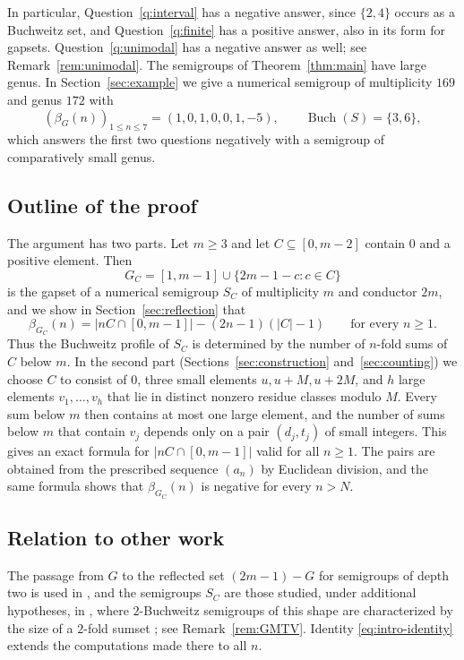 \documentclass[11pt]{amsart}
\theoremstyle{definition}
\theoremstyle{remark}
\numberwithin{equation}{section}
\newcommand{\Buch}{\operatorname{Buch}}
\begin{document}
In particular, Question~\ref{q:interval} has a negative answer, since $\{2,4\}$ occurs as a Buchweitz set, and Question~\ref{q:finite} has a positive answer, also in its form for gapsets. Question~\ref{q:unimodal} has a negative answer as well; see Remark~\ref{rem:unimodal}. The semigroups of Theorem~\ref{thm:main} have large genus. In Section~\ref{sec:example} we give a numerical semigroup of multiplicity $169$ and genus $172$ with
\[
(\beta_G(n))_{1\le n\le 7}=(1,0,1,0,0,1,-5),\qquad \Buch(S)=\{3,6\},
\]
which answers the first two questions negatively with a semigroup of comparatively small genus.

\subsection*{Outline of the proof}
The argument has two parts. Let $m\ge 3$ and let $C\subseteq[0,m-2]$ contain $0$ and a positive element. Then
\[
G_C=[1,m-1]\cup\{2m-1-c: c\in C\}
\]
is the gapset of a numerical semigroup $S_C$ of multiplicity $m$ and conductor $2m$, and we show in Section~\ref{sec:reflection} that
\begin{equation}\label{eq:intro-identity}
\beta_{G_C}(n)=|nC\cap[0,m-1]|-(2n-1)(|C|-1)\qquad\text{for every } n\ge 1.
\end{equation}
Thus the Buchweitz profile of $S_C$ is determined by the number of $n$-fold sums of $C$ below $m$. In the second part (Sections~\ref{sec:construction} and~\ref{sec:counting}) we choose $C$ to consist of $0$, three small elements $u,u+M,u+2M$, and $h$ large elements $v_1,\dots,v_h$ that lie in distinct nonzero residue classes modulo $M$. Every sum below $m$ then contains at most one large element, and the number of sums below $m$ that contain $v_j$ depends only on a pair $(d_j,t_j)$ of small integers. This gives an exact formula for $|nC\cap[0,m-1]|$ valid for all $n\ge1$. The pairs are obtained from the prescribed sequence $(a_n)$ by Euclidean division, and the same formula shows that $\beta_{G_C}(n)$ is negative for every $n>N$.

\subsection*{Relation to other work}
The passage from $G$ to the reflected set $(2m-1)-G$ for semigroups of depth two is used in \cite[Section~3]{EGMV23}, and the semigroups $S_C$ are those studied, under additional hypotheses, in \cite[Section~4]{GMTV21}, where $2$-Buchweitz semigroups of this shape are characterized by the size of a $2$-fold sumset \cite[Theorem~4.1]{GMTV21}; see Remark~\ref{rem:GMTV}. Identity \eqref{eq:intro-identity} extends the computations made there to all $n$.
\end{document}
